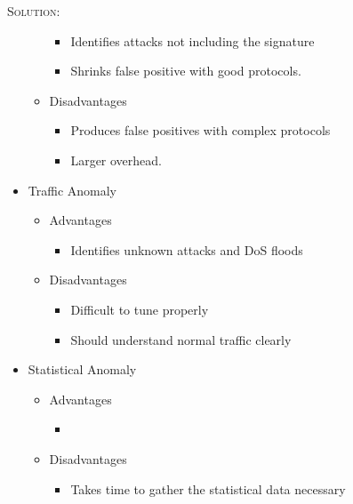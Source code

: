 \documentclass[12pt]{article}
\newenvironment{solution}
    {\textsc{Solution:}\\}
    {\newpage}%
\begin{document}
\begin{solution}
\begin{itemize}
\begin{itemize}
						\begin{itemize}
							\item Identifies attacks not including the signature
							\item Shrinks false positive with good protocols.
						\end{itemize}
					\item Disadvantages
						\begin{itemize}
							\item Produces false positives with complex protocols
							\item Larger overhead.
						\end{itemize}
				\end{itemize}
			\item Traffic Anomaly
				\begin{itemize}
					\item Advantages
						\begin{itemize}
							\item Identifies unknown attacks and DoS floods
						\end{itemize}
					\item Disadvantages
						\begin{itemize}
							\item Difficult to tune properly
							\item Should understand normal traffic clearly
						\end{itemize}
				\end{itemize}
			\item Statistical Anomaly
				\begin{itemize}
					\item Advantages
						\begin{itemize}
							\item %
						\end{itemize}
					\item Disadvantages
						\begin{itemize}
							\item Takes time to gather the statistical data necessary
						\end{itemize}
				\end{itemize}
		\end{itemize}
	\end{solution}
\end{document}
